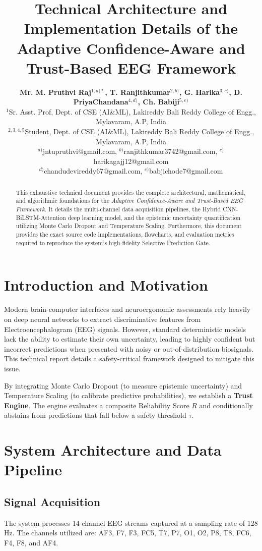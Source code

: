 \documentclass[12pt, a4paper]{article}
\title{\textbf{Technical Architecture and Implementation Details of the Adaptive Confidence-Aware and Trust-Based EEG Framework}}
\author{
    \textbf{Mr. M. Pruthvi Raj$^{1, a)*}$, T. Ranjithkumar$^{2, b)}$, G. Harika$^{3, c)}$, D. PriyaChandana$^{4, d)}$, Ch. Babiji$^{5, e)}$} \\
    \vspace{0.2cm}
    $^{1}$Sr. Asst. Prof, Dept. of CSE (AI\&ML), Lakireddy Bali Reddy College of Engg., Mylavaram, A.P, India \\
    $^{2,3,4,5}$Student, Dept. of CSE (AI\&ML), Lakireddy Bali Reddy College of Engg., Mylavaram, A.P, India \\
    \vspace{0.2cm}
    \small $^{a)}$jntupruthvi@gmail.com, $^{b)}$ranjithkumar3742@gmail.com, $^{c)}$harikagajj12@gmail.com \\
    \small $^{d)}$chandudevireddy67@gmail.com, $^{e)}$babjichode7@gmail.com
}
\date{}
\begin{document}
\maketitle

\begin{abstract}
This exhaustive technical document provides the complete architectural, mathematical, and algorithmic foundations for the \textit{Adaptive Confidence-Aware and Trust-Based EEG Framework}. It details the multi-channel data acquisition pipelines, the Hybrid CNN-BiLSTM-Attention deep learning model, and the epistemic uncertainty quantification utilizing Monte Carlo Dropout and Temperature Scaling. Furthermore, this document provides the exact source code implementations, flowcharts, and evaluation metrics required to reproduce the system's high-fidelity Selective Prediction Gate.
\end{abstract}

\tableofcontents
\newpage

\section{Introduction and Motivation}
Modern brain-computer interfaces and neuroergonomic assessments rely heavily on deep neural networks to extract discriminative features from Electroencephalogram (EEG) signals. However, standard deterministic models lack the ability to estimate their own uncertainty, leading to highly confident but incorrect predictions when presented with noisy or out-of-distribution biosignals. This technical report details a safety-critical framework designed to mitigate this issue. 

By integrating Monte Carlo Dropout (to measure epistemic uncertainty) and Temperature Scaling (to calibrate predictive probabilities), we establish a \textbf{Trust Engine}. The engine evaluates a composite Reliability Score $R$ and conditionally abstains from predictions that fall below a safety threshold $\tau$.

\section{System Architecture and Data Pipeline}
\subsection{Signal Acquisition}
The system processes 14-channel EEG streams captured at a sampling rate of 128 Hz. 
The channels utilized are: AF3, F7, F3, FC5, T7, P7, O1, O2, P8, T8, FC6, F4, F8, and AF4.
\end{document}
